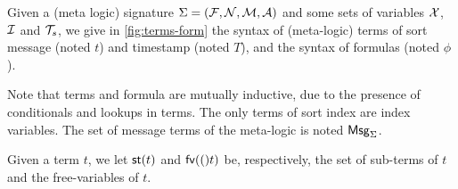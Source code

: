\begin{definition}
  Given a (meta logic) signature $\Sigma = (\mathcal{F},\mathcal{N},\mathcal{M},\mathcal{A})$
  and some sets of variables
  $\mathcal{X}$, $\mathcal{I}$ and ${\mathcal{T}_s}$,
  we give in \cref{fig:terms-form} the syntax of (meta-logic) terms
  of sort message (noted $t$) and timestamp (noted $T$),
  and the syntax of formulas (noted $\phi$).  
  
  Note that terms and formula are mutually inductive, due to the presence
  of conditionals and lookups in terms.
  The only terms of sort index are index variables.
  The set of message terms of the meta-logic is noted $\mathsf{Msg}_\Sigma$.

  Given a term $t$, we let $\mathsf{st}(t)$ and $\mathsf{fv}(()t)$ be, respectively, the set of sub-terms of $t$ and the free-variables of $t$.
\end{definition}

